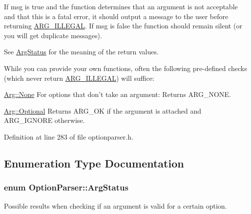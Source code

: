 If {\ttfamily msg} is {\ttfamily true} and the function determines that an argument is not acceptable and that this is a fatal error, it should output a message to the user before returning \hyperlink{namespace_option_parser_ad237d47d58c66dea8dcf4f53ac11a6e4a6ea016ff6334ed0d2ec885e96a76c472}{A\-R\-G\-\_\-\-I\-L\-L\-E\-G\-A\-L}. If {\ttfamily msg} is {\ttfamily false} the function should remain silent (or you will get duplicate messages).

See \hyperlink{namespace_option_parser_ad237d47d58c66dea8dcf4f53ac11a6e4}{Arg\-Status} for the meaning of the return values.

While you can provide your own functions, often the following pre-\/defined checks (which never return \hyperlink{namespace_option_parser_ad237d47d58c66dea8dcf4f53ac11a6e4a6ea016ff6334ed0d2ec885e96a76c472}{A\-R\-G\-\_\-\-I\-L\-L\-E\-G\-A\-L}) will suffice\-:

\begin{DoxyItemize}
\item {\ttfamily \hyperlink{struct_option_parser_1_1_arg_afd9e5e7362e4accc619fe7dee7098956}{Arg\-::\-None}} For options that don't take an argument\-: Returns A\-R\-G\-\_\-\-N\-O\-N\-E.  \item {\ttfamily \hyperlink{struct_option_parser_1_1_arg_a3fcea82be66b4aff1971cbab6deabdf1}{Arg\-::\-Optional}} Returns A\-R\-G\-\_\-\-O\-K if the argument is attached and A\-R\-G\-\_\-\-I\-G\-N\-O\-R\-E otherwise.  \end{DoxyItemize}


Definition at line 283 of file optionparser.\-h.



\subsection{Enumeration Type Documentation}
\hypertarget{namespace_option_parser_ad237d47d58c66dea8dcf4f53ac11a6e4}{
\subsubsection[{Arg\-Status}]{\setlength{\rightskip}{0pt plus 5cm}enum {\bf Option\-Parser\-::\-Arg\-Status}}}\label{namespace_option_parser_ad237d47d58c66dea8dcf4f53ac11a6e4}


Possible results when checking if an argument is valid for a certain option. 

